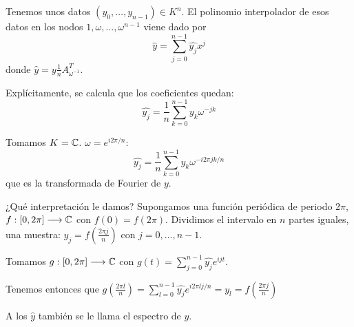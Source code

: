 Tenemos unos datos \((y_0,\ldots, y_{n-1})\in K^n\). El polinomio
interpolador de esos datos en los nodos \(1,\omega,\ldots,\omega^{n-1}\)
viene dado por
\[
  \hat{y} =\sum_{j=0}^{n-1}\hat{y_j}x^j
\]
donde \(\hat{y}=y\frac{1}{n}A^T_{\omega^{-1}}\).

Explícitamente, se calcula que los coeficientes quedan:
\[
  \hat{y_j}=\frac{1}{n}\sum_{k=0}^{n-1}y_k\omega^{-jk}
\]

Tomamos \(K=\mathbb{C}\). \(\omega = e^{i2\pi/n}\):
\[
  \hat{y_j}=\frac{1}{n}\sum_{k=0}^{n-1}y_k\omega^{-i2\pi jk/n}
\]
que es la transformada de Fourier de \(y\).

¿Qué interpretación le damos? Supongamos una función periódica de periodo
\(2\pi\), \(f:[0,2\pi]\longrightarrow\mathbb{C}\) con \(f(0)=f(2\pi)\).
Dividimos el intervalo en \(n\) partes iguales, una muestra:
\(y_j=f(\frac{2\pi j}{n})\) con \(j=0,\ldots,n-1\).

Tomamos \(g:[0,2\pi]\longrightarrow\mathbb{C}\) con
\(g(t)=\sum_{j=0}^{n-1}\hat{y_j}e^{ijt}\).

Tenemos entonces que \(g(\frac{2\pi l}{n})=
\sum_{l=0}^{n-1}\hat{y_j}e^{i2\pi lj/n} = y_l=f(\frac{2\pi j}{n})\)

A los \(\hat{y}\) también se le llama el espectro de \(y\).
